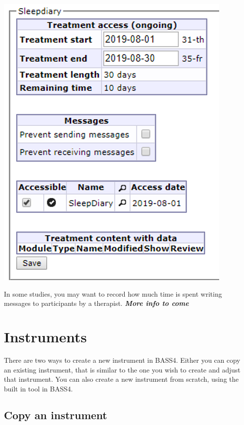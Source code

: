 \documentclass[]{book}
\begin{document}
\includegraphics{images/new-images/participantTreatAccess.png}

In some studies, you may want to record how much time is spent writing messages to participants by a therapist. \emph{\textbf{More info to come}}

\hypertarget{instruments}{%
\chapter{Instruments}\label{instruments}}

There are two ways to create a new instrument in BASS4. Either you can copy an existing instrument, that is similar to the one you wish to create and adjust that instrument. You can also create a new instrument from scratch, using the built in tool in BASS4.

\hypertarget{copy-an-instrument}{%
\section{Copy an instrument}\label{copy-an-instrument}}
\end{document}
